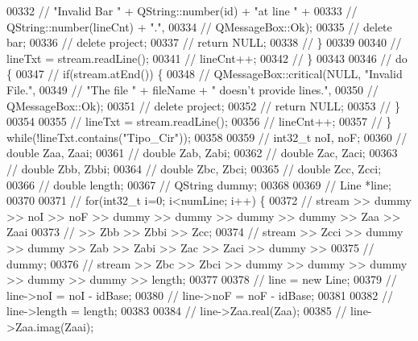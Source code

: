 \begin{DoxyCode}
00332 \textcolor{comment}{//                            "Invalid Bar " + QString::number(id) + "at line " +}
00333 \textcolor{comment}{//                            QString::number(lineCnt) + ".",}
00334 \textcolor{comment}{//                            QMessageBox::Ok);}
00335 \textcolor{comment}{//      delete bar;}
00336 \textcolor{comment}{//      delete project;}
00337 \textcolor{comment}{//      return NULL;}
00338 \textcolor{comment}{//    \}}
00339 
00340 \textcolor{comment}{//    lineTxt = stream.readLine();}
00341 \textcolor{comment}{//    lineCnt++;}
00342 \textcolor{comment}{//  \}}
00343 
00346 \textcolor{comment}{//  do \{}
00347 \textcolor{comment}{//    if(stream.atEnd()) \{}
00348 \textcolor{comment}{//      QMessageBox::critical(NULL, "Invalid File.",}
00349 \textcolor{comment}{//                            "The file " + fileName + " doesn't provide lines.",}
00350 \textcolor{comment}{//                            QMessageBox::Ok);}
00351 \textcolor{comment}{//      delete project;}
00352 \textcolor{comment}{//      return NULL;}
00353 \textcolor{comment}{//    \}}
00354 
00355 \textcolor{comment}{//    lineTxt = stream.readLine();}
00356 \textcolor{comment}{//    lineCnt++;}
00357 \textcolor{comment}{//  \} while(!lineTxt.contains("Tipo\_Cir"));}
00358 
00359 \textcolor{comment}{//  int32\_t noI, noF;}
00360 \textcolor{comment}{//  double Zaa, Zaai;}
00361 \textcolor{comment}{//  double Zab, Zabi;}
00362 \textcolor{comment}{//  double Zac, Zaci;}
00363 \textcolor{comment}{//  double Zbb, Zbbi;}
00364 \textcolor{comment}{//  double Zbc, Zbci;}
00365 \textcolor{comment}{//  double Zcc, Zcci;}
00366 \textcolor{comment}{//  double length;}
00367 \textcolor{comment}{//  QString dummy;}
00368 
00369 \textcolor{comment}{//  Line *line;}
00370 
00371 \textcolor{comment}{//  for(int32\_t i=0; i<numLine; i++) \{}
00372 \textcolor{comment}{//    stream >> dummy >> noI >> noF >> dummy >> dummy >> dummy >> dummy >> Zaa >> Zaai}
00373 \textcolor{comment}{//           >> Zbb >> Zbbi >> Zcc;}
00374 \textcolor{comment}{//    stream >> Zcci >> dummy >> dummy >> Zab >> Zabi >> Zac >> Zaci >> dummy >>}
00375 \textcolor{comment}{//           dummy;}
00376 \textcolor{comment}{//    stream >> Zbc >> Zbci >> dummy >> dummy >> dummy >> dummy >> dummy >>   length;}
00377 
00378 \textcolor{comment}{//    line = new Line;}
00379 \textcolor{comment}{//    line->noI = noI - idBase;}
00380 \textcolor{comment}{//    line->noF = noF - idBase;}
00381 
00382 \textcolor{comment}{//    line->length = length;}
00383 
00384 \textcolor{comment}{//    line->Zaa.real(Zaa);}
00385 \textcolor{comment}{//    line->Zaa.imag(Zaai);}

\end{DoxyCode}
